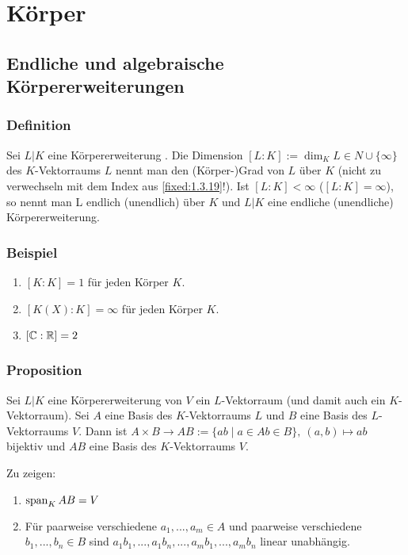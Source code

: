 \chapter{Körper \small{}}

\section{Endliche und algebraische Körpererweiterungen}

\subsection{Definition} Sei $L | K$ eine Körpererweiterung \ALref{\ref{fixed:2.3.11}}. Die Dimension $[L:K] := \dim_K L \in N \cup \{\infty\}$ des $K$-Vektorraums $L$  nennt man den (Körper-)Grad von $L$ über $K$ (nicht zu verwechseln mit dem Index aus \ref{fixed:1.3.19}!). Ist $[L:K] < \infty$ ($[L:K] = \infty$), so nennt man L endlich (unendlich) über $K$ und $L|K$ eine endliche (unendliche) Körpererweiterung.

\subsection{Beispiel}
\begin{enumerate}[label=(\alph*)]
	\item
		$[K:K] = 1$ für jeden Körper $K$.
		
	\item
		$[K(X):K] = \infty$ für jeden Körper $K$.
		
	\item
		$[\mathbb C:\mathbb R] = 2$
\end{enumerate}

\subsection{Proposition} Sei $L|K$ eine Körpererweiterung von $V$ ein $L$-Vektorraum (und damit auch ein $K$-Vektorraum). Sei $A$ eine Basis des $K$-Vektorraums $L$ und $B$ eine Basis des $L$-Vektorraums $V$. Dann ist $A \times B \to AB := \{ab \mid a \in A b \in B\},~(a,b) \mapsto ab$ bijektiv und $AB$ eine Basis des $K$-Vektorraums $V$.

\proof Zu zeigen:
\begin{enumerate}[label=(\alph*)]
	\item
		$\operatorname{span}_K AB = V$
		
	\item
		Für paarweise verschiedene $a_1,...,a_m \in A$ und paarweise verschiedene $b_1,...,b_n \in B$ sind $a_ 1b_1,...,a_1 b_n,...,a_m b_1,...,a_m b_n$ linear unabhängig.
\end{enumerate}


